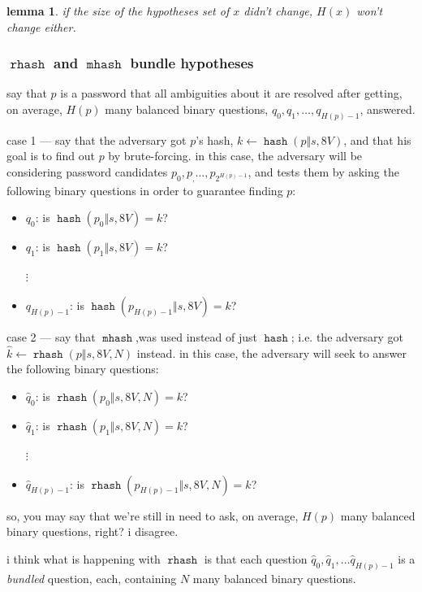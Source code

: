 \documentclass[twocolumn]{article}
\newtheorem{lemma}{lemma}
\DeclareMathOperator{\hash}{\mathtt{hash}}
\DeclareMathOperator{\rhash}{\mathtt{rhash}}
\DeclareMathOperator{\mhash}{\mathtt{mhash}}
\begin{document}
\begin{lemma}
    if the size of the hypotheses set of $x$ didn't change, $H(x)$ won't
    change either.
\end{lemma}

\subsubsection{$\rhash$ and $\mhash$ bundle hypotheses}
say that $p$ is a password that all ambiguities about it are resolved after
getting, on average, $H(p)$ many balanced binary questions, $q_0, q_1,
\ldots, q_{H(p)-1}$, answered.

case 1 --- say that the adversary got $p$'s hash, $k \gets \hash(p \Vert s,
8V)$, and that his goal is to find out $p$ by brute-forcing.  in this case,
the adversary will be considering password candidates $p_0, p_, \ldots,
p_{2^{H(p)-1}}$, and tests them by asking the following binary questions in
order to guarantee finding $p$:
\begin{itemize}
    \item $q_0$: is $\hash(p_0 \Vert s, 8V) = k$?
    \item $q_1$: is $\hash(p_1 \Vert s, 8V) = k$?

    $\vdots$

    \item $q_{H(p)-1}$: is $\hash(p_{H(p)-1} \Vert s, 8V) = k$?
\end{itemize}

case 2 --- say that $\mhash$,was used instead of just $\hash$;  i.e. the
adversary got $\hat k \gets \rhash(p \Vert s, 8V, N)$ instead.  in this
case, the adversary will seek to answer the following binary questions:
\begin{itemize}
    \item $\hat q_0$: is $\rhash(p_0 \Vert s, 8V, N) = k$?
    \item $\hat q_1$: is $\rhash(p_1 \Vert s, 8V, N) = k$?

    $\vdots$

    \item $\hat q_{H(p)-1}$: is $\rhash(p_{H(p)-1} \Vert s, 8V, N) = k$?
\end{itemize}

so, you may say that we're still in need to ask, on average, $H(p)$ many
balanced binary questions, right?  i disagree.

i think what is happening with $\rhash$ is that each question $\hat q_0,
\hat q_1, \ldots \hat q_{H(p)-1}$ is a \emph{bundled} question, each,
containing $N$ many balanced binary questions.
\end{document}
